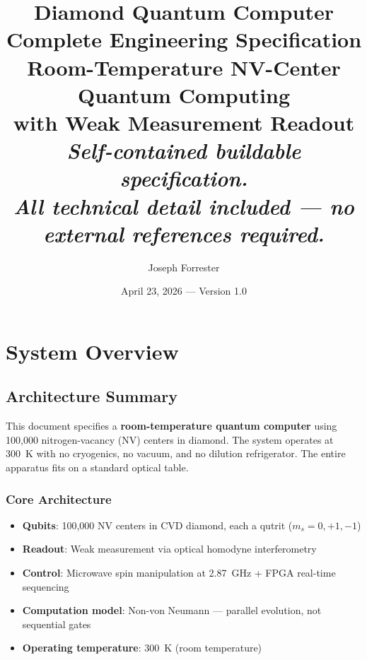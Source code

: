 \documentclass[11pt,a4paper,openany]{book}
\title{%
  \textbf{\Huge Diamond Quantum Computer}\\[12pt]
  \textbf{\Large Complete Engineering Specification}\\[24pt]
  \large Room-Temperature NV-Center Quantum Computing\\
  with Weak Measurement Readout\\[36pt]
  \normalsize\textit{Self-contained buildable specification.}\\
  \normalsize\textit{All technical detail included --- no external references required.}
}
\author{Joseph Forrester}
\date{April 23, 2026 --- Version 1.0}
\begin{document}
\maketitle
\thispagestyle{empty}

\clearpage
\tableofcontents

\chapter{System Overview}\label{ch:overview}

\section{Architecture Summary}

This document specifies a \textbf{room-temperature quantum computer} using 100,000 nitrogen-vacancy (NV) centers in diamond. The system operates at 300~K with no cryogenics, no vacuum, and no dilution refrigerator. The entire apparatus fits on a standard optical table.

\subsection{Core Architecture}

\begin{itemize}[nosep]
  \item \textbf{Qubits}: 100,000 NV centers in CVD diamond, each a qutrit ($m_s = 0, +1, -1$)
  \item \textbf{Readout}: Weak measurement via optical homodyne interferometry
  \item \textbf{Control}: Microwave spin manipulation at 2.87~GHz + FPGA real-time sequencing
  \item \textbf{Computation model}: Non-von Neumann --- parallel evolution, not sequential gates
  \item \textbf{Operating temperature}: 300~K (room temperature)
\end{itemize}
\end{document}
